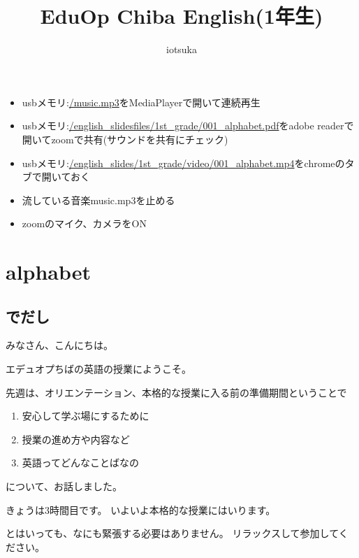 \documentclass[book,jafontscale=0.9247]{jlreq}
\begin{document}
\thispagestyle{empty}
\title{EduOp Chiba English(1年生)}
\author{iotsuka}
\maketitle

\begin{tcolorbox}[title=いちばんはじめに]
\begin{itemize}
 \item usbメモリ:\url{/music.mp3}をMediaPlayerで開いて連続再生
 \item usbメモリ:\url{/english_slidesfiles/1st_grade/001_alphabet.pdf}をadobe readerで開いてzoomで共有(サウンドを共有にチェック)
 \item usbメモリ:\url{/english_slides/1st_grade/video/001_alphabet.mp4}をchromeのタブで開いておく
\end{itemize}
\end{tcolorbox}


\begin{tcolorbox}[title=授業の直前に]
\begin{itemize}
 \item 流している音楽music.mp3を止める
 \item zoomのマイク、カメラをON
\end{itemize}
\end{tcolorbox}

\tableofcontents
\newpage\setcounter{page}{1}
\chapter{alphabet}
\section{でだし}
みなさん、こんにちは。

エデュオプちばの英語の授業にようこそ。

先週は、オリエンテーション、本格的な授業に入る前の準備期間ということで
\begin{enumerate}
 \item 安心して学ぶ場にするために
 \item 授業の進め方や内容など
 \item 英語ってどんなことばなの
\end{enumerate}
について、お話しました。

きょうは3時間目です。
いよいよ本格的な授業にはいります。

とはいっても、なにも緊張する必要はありません。
リラックスして参加してください。
\end{document}
